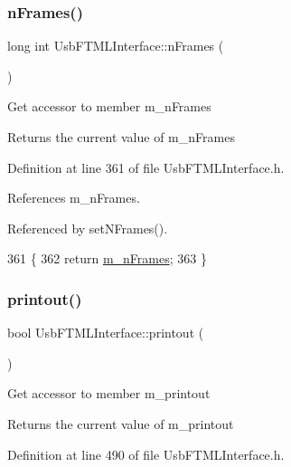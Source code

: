 \subsubsection{\texorpdfstring{n\+Frames()}{nFrames()}}
{\footnotesize\ttfamily long int Usb\+F\+T\+M\+L\+Interface\+::n\+Frames (\begin{DoxyParamCaption}{ }\end{DoxyParamCaption})\hspace{0.3cm}{\ttfamily [inline]}}

Get accessor to member m\+\_\+n\+Frames \begin{DoxyReturn}{Returns}
the current value of m\+\_\+n\+Frames 
\end{DoxyReturn}


Definition at line 361 of file Usb\+F\+T\+M\+L\+Interface.\+h.



References m\+\_\+n\+Frames.



Referenced by set\+N\+Frames().


\begin{DoxyCode}
361                       \{
362     \textcolor{keywordflow}{return} \hyperlink{classUsbFTMLInterface_ac7b9fb80fb8653a366c53ce3567cb823}{m\_nFrames};
363   \}
\end{DoxyCode}
\mbox{\label{classUsbFTMLInterface_a1045e3851406cf07e31c498d0de230e1}} 
\subsubsection{\texorpdfstring{printout()}{printout()}}
{\footnotesize\ttfamily bool Usb\+F\+T\+M\+L\+Interface\+::printout (\begin{DoxyParamCaption}{ }\end{DoxyParamCaption})\hspace{0.3cm}{\ttfamily [inline]}}

Get accessor to member m\+\_\+printout \begin{DoxyReturn}{Returns}
the current value of m\+\_\+printout 
\end{DoxyReturn}


Definition at line 490 of file Usb\+F\+T\+M\+L\+Interface.\+h.



